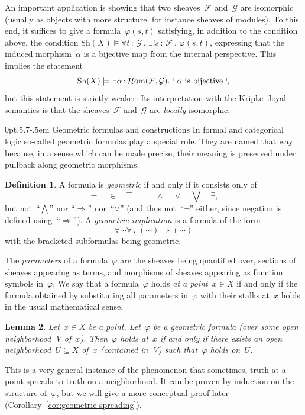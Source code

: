 \documentclass[10pt,reqno,a4paper]{amsbook}
\makeatletter
\theoremstyle{definition}
\newtheorem{defn}{Definition}[section]
\theoremstyle{plain}
\newtheorem{lemma}[defn]{Lemma}
\theoremstyle{remark}
\newcommand{\F}{\mathcal{F}}
\newcommand{\G}{\mathcal{G}}
\newcommand{\HOM}{\mathcal{H}\mathrm{om}}
\newcommand{\Sh}{\mathrm{Sh}}
\newcommand{\?}{\,{:}\,}
\renewcommand{\_}{\mathpunct{.}\,}
\newcommand{\speak}[1]{\ulcorner\text{\textnormal{#1}}\urcorner}
\renewenvironment{proof}[1][\proofname]{\par
  \pushQED{\qed}%
  \normalfont \topsep6\p@\@plus6\p@\relax
  \trivlist
  \item[\hskip\labelsep
        \itshape
    #1\@addpunct{.}]\ignorespaces
}{%
  \popQED\endtrivlist\@endpefalse
}
\def\subsection{\@startsection{subsection}{2}%
  {0pt}{.5\linespacing\@plus.7\linespacing}{-.5em}%
  {\normalfont\bfseries}}
\makeatother
\begin{document}
An important application is showing that two sheaves~$\F$ and~$\G$ are
isomorphic (usually as objects with more structure, for instance sheaves of
modules). To this end, it suffices to give a formula~$\varphi(s,t)$ satisfying,
in addition to the condition above, the condition
$\Sh(X) \models \forall t\?\G\_ \exists! s\?\F\_ \varphi(s,t)$,
expressing that the induced morphism~$\alpha$ is a bijective map from the
internal perspective. This implies the statement
\[ \Sh(X) \models \exists \alpha\?\HOM(\F,\G)\_ \speak{$\alpha$ is bijective},
\]
but this statement is strictly weaker: Its interpretation with the
Kripke--Joyal semantics is that the sheaves~$\F$ and~$\G$ are \emph{locally}
isomorphic.


\subsection{Geometric formulas and
constructions}\label{sect:geometric-formulas-and-constructions}
In formal and categorical logic so-called geometric formulas play a
special role. They are named that way because, in a sense which can be made
precise, their meaning is preserved under pullback along geometric morphisms.
\begin{defn}\label{defn:geometric-formulas}
A formula is \emph{geometric} if and only if it consists only of
\[ {=} \quad {\in} \quad {\top} \quad {\bot} \quad {\wedge} \quad {\vee} \quad
{\bigvee} \quad {\exists}, \]
but not~``$\bigwedge$'' nor ``$\Rightarrow$'' nor~``$\forall$'' (and thus
not~``$\neg$'' either, since negation is defined using~``$\Rightarrow$'').
A \emph{geometric implication} is a formula of the form
\[ \forall \cdots \forall\_ (\cdots) \Rightarrow (\cdots) \]
with the bracketed subformulas being geometric.
\end{defn}
The \emph{parameters} of a formula~$\varphi$ are the sheaves
being quantified over, sections of sheaves appearing as terms, and morphisms of
sheaves appearing as function symbols in~$\varphi$.
We say that a formula~$\varphi$ holds \emph{at a point~$x \in X$} if and only
if the formula obtained by substituting all parameters in~$\varphi$ with their
stalks at~$x$ holds in the usual mathematical sense.

\begin{lemma}\label{lemma:geometric-stalk-neighborhood}
Let~$x \in X$ be a point. Let~$\varphi$ be a geometric formula (over some open
neighborhood~V of~$x$).
Then~$\varphi$ holds at~$x$ if and only if there exists an open neighborhood~$U
\subseteq X$ of~$x$ (contained in~V) such that~$\varphi$ holds on~$U$.
\end{lemma}
\begin{proof}This is a very general instance of the phenomenon that sometimes,
truth at a point spreads to truth on a neighborhood. It can be proven by
induction on the structure of~$\varphi$, but we will give a more conceptual
proof later (Corollary~\ref{cor:geometric-spreading}).
\end{proof}
\end{document}
